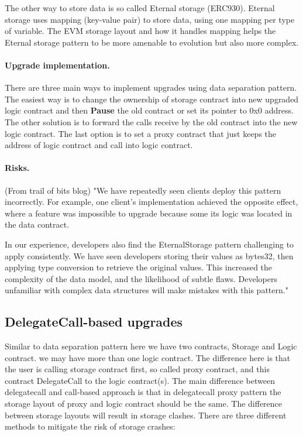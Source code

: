 The other way to store data is so called Eternal storage (ERC930). Eternal storage uses mapping (key-value pair) to store data, using one mapping per type of variable. The EVM storage layout and how it handles mapping helps the Eternal storage pattern to be more amenable to evolution but also more complex.

\paragraph{Upgrade implementation. } There are three main ways to implement upgrades using data separation pattern. The easiest way is to change the ownership of storage contract into new upgraded logic contract and then \textbf{Pause} the old contract or set its pointer to 0x0 address. The other solution is to forward the calls receive by the old contract into the new logic contract. The last option is to set a proxy contract that just keeps the address of logic contract and call into logic contract.

\paragraph{Risks. } (From trail of bits blog)
"We have repeatedly seen clients deploy this pattern incorrectly. For example, one client’s implementation achieved the opposite effect, where a feature was impossible to upgrade because some its logic was located in the data contract.

In our experience, developers also find the EternalStorage pattern challenging to apply consistently. We have seen developers storing their values as bytes32, then applying type conversion to retrieve the original values. This increased the complexity of the data model, and the likelihood of subtle flaws. Developers unfamiliar with complex data structures will make mistakes with this pattern."



\subsection{DelegateCall-based upgrades}
Similar to data separation pattern here we have two contracts, Storage and Logic contract. we may have more than one logic contract. The difference here is that the user is calling storage contract first, so called proxy contract, and this contract DelegateCall to the logic contract(s).
The main difference between delegatecall and call-based approach is that in delegatecall proxy pattern the storage layout of proxy and logic contract should be the same. The difference between storage layouts will result in storage clashes. 
There are three different methods to mitigate the risk of storage crashes:

